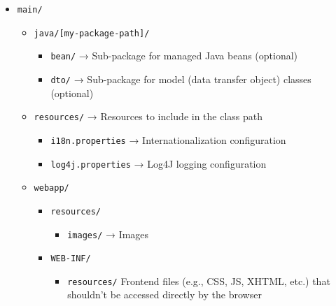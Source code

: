 \begin{enumerate}
\begin{itemize}
\begin{itemize}
      \begin{itemize}
      \tightlist
      \item
        \texttt{main/}

        \begin{itemize}
        \tightlist
        \item
          \texttt{java/{[}my-package-path{]}/}

          \begin{itemize}
          \tightlist
          \item
            \texttt{bean/} → Sub-package for managed Java beans
            (optional)
          \item
            \texttt{dto/} → Sub-package for model (data transfer object)
            classes (optional)
          \end{itemize}
        \item
          \texttt{resources/} → Resources to include in the class path

          \begin{itemize}
          \tightlist
          \item
            \texttt{i18n.properties} → Internationalization
            configuration
          \item
            \texttt{log4j.properties} → Log4J logging configuration
          \end{itemize}
        \item
          \texttt{webapp/}

          \begin{itemize}
          \tightlist
          \item
            \texttt{resources/}

            \begin{itemize}
            \tightlist
            \item
              \texttt{images/} → Images
            \end{itemize}
          \item
            \texttt{WEB-INF/}

            \begin{itemize}
            \tightlist
            \item
              \texttt{resources/} Frontend files (e.g., CSS, JS, XHTML,
              etc.) that shouldn't be accessed directly by the browser


\end{itemize}
\end{itemize}
\end{itemize}
\end{itemize}
\end{itemize}
\end{itemize}
\end{enumerate}
